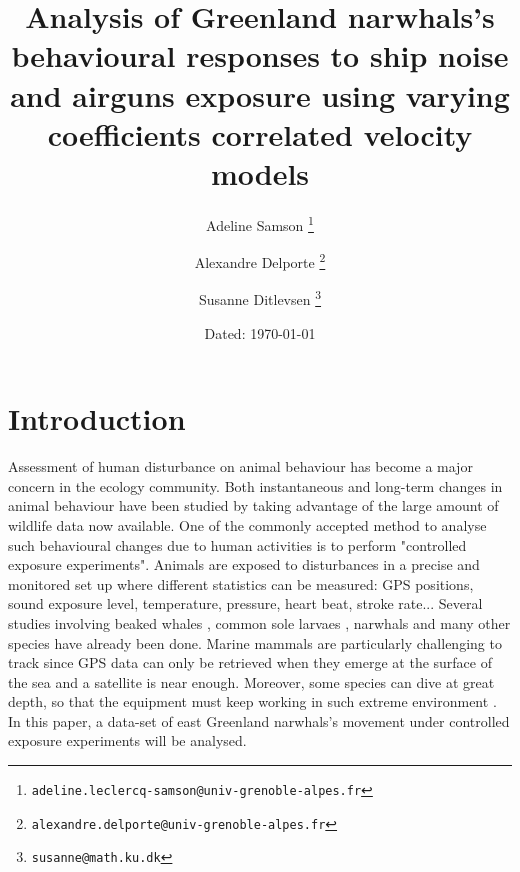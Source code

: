 \documentclass[11pt]{article}
\title{
 \textbf{Analysis of Greenland narwhals's behavioural responses to ship noise and airguns exposure using varying coefficients correlated velocity models}}
\author{Adeline Samson%
\thanks{\texttt{adeline.leclercq-samson@univ-grenoble-alpes.fr}}}
\author{Alexandre Delporte%
\thanks{\texttt{alexandre.delporte@univ-grenoble-alpes.fr}} }
\affil{Laboratoire Jean Kuntzmann, Université Grenoble-Alpes, France}
\author{Susanne Ditlevsen%
\thanks{\texttt{susanne@math.ku.dk}}}
\affil{Department of Statistics, University of Copenhagen, Denmark}
\date{Dated: \today}
\newcommand {\1}{\mathbb{1}}
\begin{document}
\maketitle


\newpage

\section{Introduction}



Assessment of human disturbance on animal behaviour has become a major concern in the ecology community. Both instantaneous and long-term changes in animal behaviour have been studied by taking advantage of the large amount of wildlife data now available. One of the commonly accepted method to analyse such behavioural changes due to human activities is to perform "controlled exposure experiments". Animals are exposed to disturbances in a precise and monitored set up where different  statistics can be measured: GPS positions, sound exposure level, temperature, pressure, heart beat, stroke rate...  
Several studies involving beaked whales \parencite{tyack_beaked_2011}, common sole larvaes \parencite{bolle_common_2012}, narwhals \parencite{heide-jorgensen_behavioral_2021} and many other species have already been done. Marine mammals are particularly challenging to track since GPS data can only be retrieved when they emerge at the surface of the sea and a satellite is near enough. Moreover, some species can dive at great depth, so that the equipment must keep working in such extreme environment \parencite{cioffi_trade-offs_nodate}. In this paper, a data-set of east Greenland narwhals's movement under controlled exposure experiments will be analysed. \\
\end{document}
